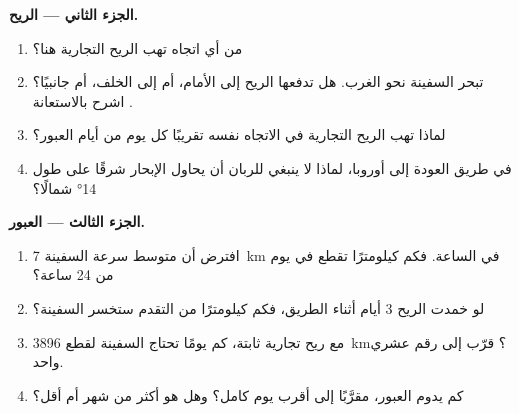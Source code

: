 \begin{problem}
\noindent\textbf{الجزء الثاني --- الريح.}\par\nopagebreak
\begin{enumerate}[resume, beginpenalty=10000]
  \item من أي اتجاه تهب الريح التجارية هنا؟
  \item تبحر السفينة نحو الغرب. هل تدفعها الريح إلى الأمام، أم إلى الخلف،
        أم جانبيًا؟ اشرح بالاستعانة .
  \item لماذا تهب الريح التجارية في الاتجاه نفسه تقريبًا كل يوم
        من أيام العبور؟
  \item في طريق العودة إلى أوروبا، لماذا لا ينبغي للربان أن يحاول
        الإبحار شرقًا على طول \ang{14} شمالًا؟
\end{enumerate}

\noindent\textbf{الجزء الثالث --- العبور.}\par\nopagebreak
\begin{enumerate}[resume, beginpenalty=10000]
  \item افترض أن متوسط سرعة السفينة \qty{7}{km} في الساعة. فكم
        كيلومترًا تقطع في يوم من 24 ساعة؟
  \item لو خمدت الريح 3 أيام أثناء الطريق، فكم
        كيلومترًا من التقدم ستخسر السفينة؟
  \item مع ريح تجارية ثابتة، كم يومًا تحتاج السفينة لقطع
        \qty{3896}{km}؟ قرّب إلى رقم عشري واحد.
  \item كم يدوم العبور، مقرَّبًا إلى أقرب يوم كامل؟ وهل هو أكثر من
        شهر أم أقل؟
\end{enumerate}
\end{problem}

